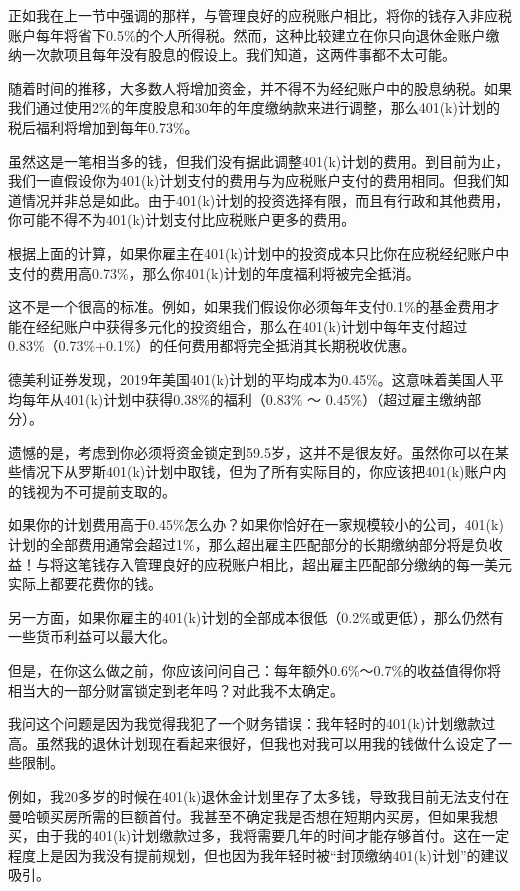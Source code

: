 正如我在上一节中强调的那样，与管理良好的应税账户相比，将你的钱存入非应税账户每年将省下0.5\%的个人所得税。然而，这种比较建立在你只向退休金账户缴纳一次款项且每年没有股息的假设上。我们知道，这两件事都不太可能。

随着时间的推移，大多数人将增加资金，并不得不为经纪账户中的股息纳税。如果我们通过使用2\%的年度股息和30年的年度缴纳款来进行调整，那么401(k)计划的税后福利将增加到每年0.73\%。

虽然这是一笔相当多的钱，但我们没有据此调整401(k)计划的费用。到目前为止，我们一直假设你为401(k)计划支付的费用与为应税账户支付的费用相同。但我们知道情况并非总是如此。由于401(k)计划的投资选择有限，而且有行政和其他费用，你可能不得不为401(k)计划支付比应税账户更多的费用。

根据上面的计算，如果你雇主在401(k)计划中的投资成本只比你在应税经纪账户中支付的费用高0.73\%，那么你401(k)计划的年度福利将被完全抵消。

这不是一个很高的标准。例如，如果我们假设你必须每年支付0.1\%的基金费用才能在经纪账户中获得多元化的投资组合，那么在401(k)计划中每年支付超过0.83\%（0.73\%+0.1\%）的任何费用都将完全抵消其长期税收优惠。

德美利证券发现，2019年美国401(k)计划的平均成本为0.45\%。这意味着美国人平均每年从401(k)计划中获得0.38\%的福利（0.83\% ～ 0.45\%）（超过雇主缴纳部分）。

遗憾的是，考虑到你必须将资金锁定到59.5岁，这并不是很友好。虽然你可以在某些情况下从罗斯401(k)计划中取钱，但为了所有实际目的，你应该把401(k)账户内的钱视为不可提前支取的。

如果你的计划费用高于0.45\%怎么办？如果你恰好在一家规模较小的公司，401(k)计划的全部费用通常会超过1\%，那么超出雇主匹配部分的长期缴纳部分将是负收益！与将这笔钱存入管理良好的应税账户相比，超出雇主匹配部分缴纳的每一美元实际上都要花费你的钱。

另一方面，如果你雇主的401(k)计划的全部成本很低（0.2\%或更低），那么仍然有一些货币利益可以最大化。

但是，在你这么做之前，你应该问问自己：每年额外0.6\%～0.7\%的收益值得你将相当大的一部分财富锁定到老年吗？对此我不太确定。

我问这个问题是因为我觉得我犯了一个财务错误：我年轻时的401(k)计划缴款过高。虽然我的退休计划现在看起来很好，但我也对我可以用我的钱做什么设定了一些限制。

例如，我20多岁的时候在401(k)退休金计划里存了太多钱，导致我目前无法支付在曼哈顿买房所需的巨额首付。我甚至不确定我是否想在短期内买房，但如果我想买，由于我的401(k)计划缴款过多，我将需要几年的时间才能存够首付。这在一定程度上是因为我没有提前规划，但也因为我年轻时被“封顶缴纳401(k)计划”的建议吸引。

